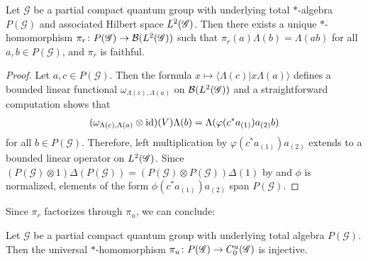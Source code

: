 \begin{Prop} \label{prop:gns} Let $\mathscr{G}$ be a partial compact
  quantum group with underlying total $*$-algebra $P(\mathscr{G})$ and
  associated Hilbert space $L^{2}(\mathscr{G})$. Then there exists a unique
  $*$-homomorphism $\pi_{r}\colon P(\mathscr{G}) \to {\cal B}(L^{2}(\mathscr{G}))$
  such that $\pi_{r}(a)\Lambda(b)=\Lambda(ab)$ for all $a,b\in
  P(\mathscr{G})$, and $\pi_{r}$ is faithful.
\end{Prop}
\begin{proof} 
  Let $a,c \in P(\mathscr{G})$. Then the formula $x \mapsto \langle
\Lambda(c) | x\Lambda(a)\rangle$ defines a bounded linear functional
  $\omega_{\Lambda(c),\Lambda(a)}$ on ${\cal B}(L^{2}(\mathscr{G}))$ and a
  straightforward computation shows that
  \begin{align} \label{eq:vn-slice}
    (\omega_{\Lambda(c),\Lambda(a)}\otimes \operatorname{id})(V)\Lambda(b) =
    \Lambda(\varphi(c^*a_{(1)})a_{(2)}b)
  \end{align}
  for all $b\in P(\mathscr{G})$. Therefore, left multiplication by
  $\varphi(c^*a_{(1)})a_{(2)}$ extends to a bounded linear operator on
  $L^{2}(\mathscr{G})$. 
 Since $(P(\mathscr{G})\otimes 1)\Delta(P(\mathscr{G})) = (P(\mathscr{G})\otimes
  P(\mathscr{G}))\Delta(1)$ by  \cite[Proposition 1.30]{DCT1} and $\phi$ is
  normalized,  elements of the form $\phi(c^{*}a_{(1)})a_{(2)}$ span
  $P(\mathscr{G})$. 
\end{proof}
Since $\pi_{r}$ factorizes through $\pi_{u}$, we can conclude:
\begin{Cor}
  Let $\mathscr{G}$ be a partial compact quantum group with underlying
  total algebra $P(\mathscr{G})$. Then the
universal $*$-homomorphism $\pi_{u} \colon P(\mathscr{G}) \to C^{u}_{0}(\mathscr{G})$ is injective.
\end{Cor}

